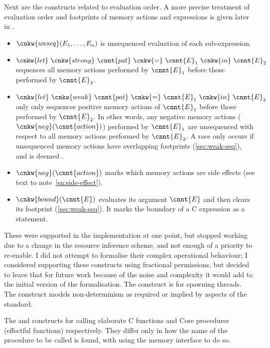 Next are the constructs related to evaluation order. A more precise treatment
of evaluation order and footprints of memory actions and expressions is given
later in .
\begin{itemize}
    \item $\cnkw{unseq}(E_1, \ldots, E_n)$ is unsequenced evaluation of each
        sub-expression.
    \item $\cnkw{let}\ \cnkw{strong}\ \cnnt{pat}\ \cnkw{=}\ \cnnt{E}_1
        \ \cnkw{in}\ \cnnt{E}_2$ sequences all memory actions performed by
        $\cnnt{E}_1$ before those performed by $\cnnt{E}_2$.
    \item $\cnkw{let}\ \cnkw{weak}\ \cnnt{pat}\ \cnkw{=}\ \cnnt{E}_1
        \ \cnkw{in}\ \cnnt{E}_2$ only only sequences positive memory actions of
        $\cnnt{E}_1$ before those performed by $\cnnt{E}_2$. In other words,
        any negative memory actions ($\cnkw{neg}(\cnnt{action})$) performed by
        $\cnnt{E}_1$ are unsequenced with respect to all memory actions
        performed by $\cnnt{E}_2$. A race only occurs if unsequenced memory
        actions have overlapping footprints (\cref{sec:weak-seq}), and is
        deemed .
    \item $\cnkw{neg}(\cnnt{action})$ marks which memory actions are side
        effects (see text to note~\ref{sn:side-effect}).
    \item $\cnkw{bound}(\cnnt{E})$ evaluates its argument $\cnnt{E}$ and
        then clears its footprint (\cref{sec:weak-seq}). It marks the
        boundary of a C expression as a statement.
\end{itemize}

These were supported in the implementation at one point, but stopped working due to a change in the resource
inference scheme, and not enough of a priority to re-enable. I did not attempt
to formalise their complex operational behaviour; I considered supporting these
constructs using fractional permissions, but decided to leave that for future
work because of the noise and complexity it would add to the initial version of
the formalisation. The  construct is for spawning %
threads. The  construct models non-determinism as %
required or implied by aspects of the standard.

The  and  constructs for %
calling elaborate C functions and Core procedures (effectful functions)
respectively. They differ only in how the name of the procedure to be called is
found, with  using the memory interface to do so. %

